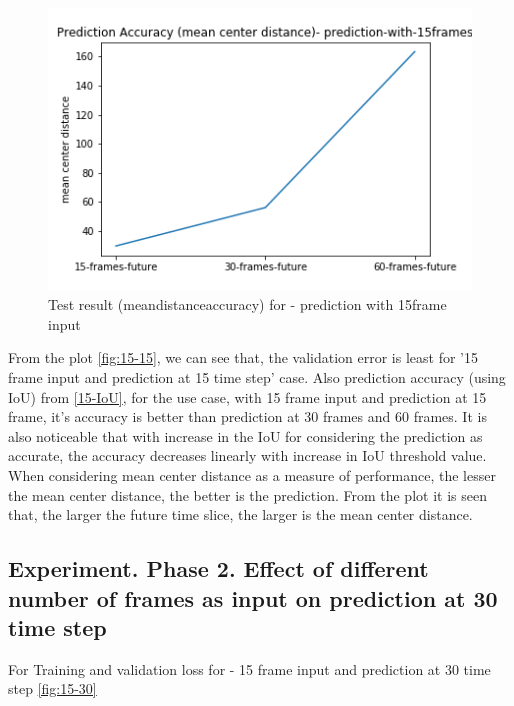 \begin{figure}[H] 
\includegraphics[scale=0.8]{prediction-with-15frames-mean_distance_accuracy}
\begin{center}
\caption{Test result (mean\textunderscore distance\textunderscore accuracy) for - prediction with 15frame input }
\label{15-mcd}
\end{center}
\end{figure}

From the plot \ref{fig:15-15}, we can see that, the validation error is least for '15 frame input and prediction at 15 time step' case. Also prediction accuracy (using IoU) from \ref{15-IoU}, for the use case, with 15 frame input and prediction at 15 frame, it's accuracy is better than prediction at 30 frames and 60 frames. It is also noticeable that with increase in the IoU for considering the prediction as accurate, the accuracy decreases linearly with increase in IoU threshold value. When considering mean center distance as a measure of performance, the lesser the mean center distance, the better is the prediction. From the plot it is seen that, the larger the future time slice, the larger is the mean center distance.

\subsection{Experiment. Phase 2. Effect of different number of frames as input on prediction at 30  time step}
For Training and validation loss for - 15 frame input and prediction at 30 time step \ref{fig:15-30}

